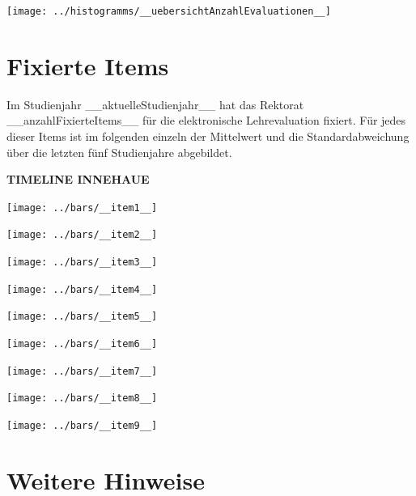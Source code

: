 \documentclass[11pt]{article}
\begin{document}
\texttt{[image: ../histogramms/\_\_uebersichtAnzahlEvaluationen\_\_]}

\newpage
\section{Fixierte Items}
\label{sec: fixierteItems}
Im Studienjahr __aktuelleStudienjahr__ hat das Rektorat __anzahlFixierteItems__ für die elektronische Lehrevaluation fixiert. Für jedes dieser Items ist im folgenden einzeln der Mittelwert und die Standardabweichung über die letzten fünf Studienjahre abgebildet.

\textbf{TIMELINE INNEHAUE}
\bigskip

\texttt{[image: ../bars/\_\_item1\_\_]}

\texttt{[image: ../bars/\_\_item2\_\_]}

\texttt{[image: ../bars/\_\_item3\_\_]}

\texttt{[image: ../bars/\_\_item4\_\_]}

\texttt{[image: ../bars/\_\_item5\_\_]}

\texttt{[image: ../bars/\_\_item6\_\_]}

\texttt{[image: ../bars/\_\_item7\_\_]}

\texttt{[image: ../bars/\_\_item8\_\_]}

\texttt{[image: ../bars/\_\_item9\_\_]}




\newpage
\section{Weitere Hinweise}
\label{weiteres}
\end{document}

